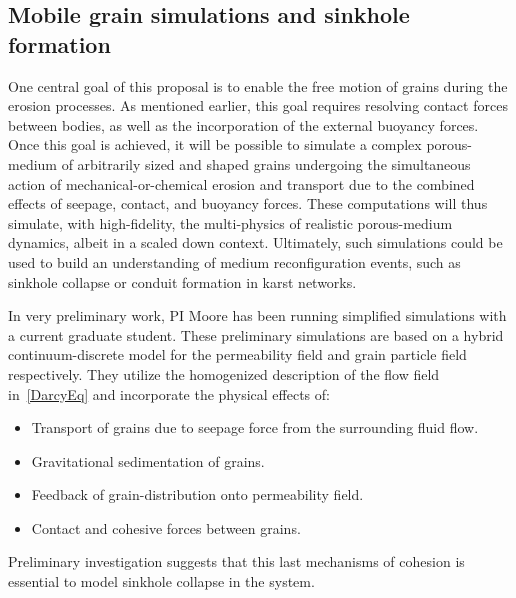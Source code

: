 \documentclass[11pt]{article}
\begin{document}

\subsection{Mobile grain simulations and sinkhole formation}


One central goal of this proposal is to enable the free motion of grains during the erosion processes. As mentioned earlier, this goal requires resolving contact forces between bodies, as well as the incorporation of the external buoyancy forces. Once this goal is achieved, it will be possible to simulate a complex porous-medium of arbitrarily sized and shaped grains undergoing the simultaneous action of mechanical-or-chemical erosion and transport due to the combined effects of seepage, contact, and buoyancy forces. These computations will thus simulate, with high-fidelity, the multi-physics of realistic porous-medium dynamics, albeit in a scaled down context. Ultimately, such simulations could be used to build an understanding of medium reconfiguration events, such as sinkhole collapse or conduit formation in karst networks.

In very preliminary work, PI Moore has been running simplified simulations with a current graduate student. These preliminary simulations are based on a hybrid continuum-discrete model for the permeability field and grain particle field respectively. They utilize the homogenized description of the flow field in~\eqref{DarcyEq} and incorporate the physical effects of:
\begin{itemize}[noitemsep]
\item Transport of grains due to seepage force from the surrounding fluid flow.
\item Gravitational sedimentation of grains.
\item Feedback of grain-distribution onto permeability field.
\item Contact and cohesive forces between grains.
\end{itemize}
Preliminary investigation suggests that this last mechanisms of cohesion is essential to model sinkhole collapse in the system.
\end{document}
